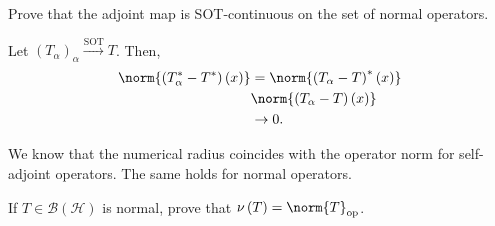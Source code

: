 \documentclass[10pt]{mypackage}
\begin{document}
\begin{exercise}
  Prove that the adjoint map is SOT-continuous on the set of normal operators.
\end{exercise}
\begin{solution}
  Let $\left(T_{\alpha}\right)_{\alpha} \xrightarrow{\text{SOT}} T$. Then,
  \begin{align*}
    \norm{\left(T_{\alpha}^{\ast}- T^{\ast}\right)\left(x\right)} &= \norm{\left(T_{\alpha} - T\right)^{\ast}\left(x\right)}\\ 
                                                               &\norm{\left(T_{\alpha} - T\right)\left(x\right)}\\
                                                               &\rightarrow 0.
  \end{align*}
\end{solution}
We know that the numerical radius coincides with the operator norm for self-adjoint operators. The same holds for normal operators.
\begin{exercise}
  If $T\in \mathcal{B}\left(\mathcal{H}\right)$ is normal, prove that $\nu\left(T\right) = \norm{T}_{\text{op}}$.
\end{exercise}
\end{document}
